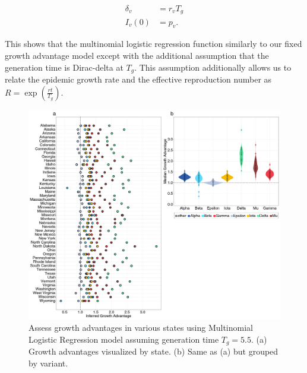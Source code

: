 \documentclass[12pt]{article}
\begin{document}
\begin{align}
  \delta_{v} &= r_{v}T_{g}\\
  I_{v}(0) &= p_{v}.
\end{align}

This shows that the multinomial logistic regression function similarly to our fixed growth advantage model except with the additional assumption that the generation time is Dirac-delta at $T_{g}$. 
This assumption additionally allows us to relate the epidemic growth rate and the effective reproduction number as $R = \exp(\frac{rt}{T_{g}})$. \cite{Wallinga2006}

\begin{figure}
  \centering
  \includegraphics[width=\linewidth]{figs/fig_MLR_growth_advantages_supp.png}
  \caption{Assess growth advantages in various states using Multinomial Logistic Regression model assuming generation time $T_{g} = 5.5$. 
  (a) Growth advantages visualized by state.
  (b) Same as (a) but grouped by variant.}%
  \label{fig:MLR_growth_advantages}
\end{figure}


\end{document}
